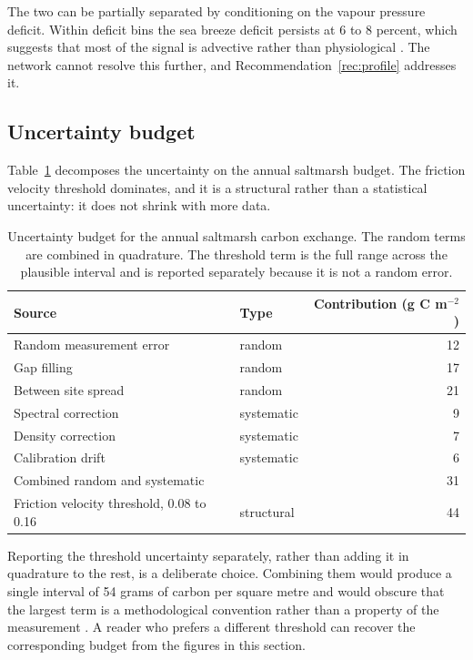 The two can be partially separated by conditioning on the vapour pressure
deficit. Within deficit bins the sea breeze deficit persists at 6 to 8 percent,
which suggests that most of the signal is advective rather than physiological
\citep{grothe2024seabreeze}.
The network cannot resolve this further, and Recommendation~\ref{rec:profile}
addresses it.

\subsection{Uncertainty budget}
\label{sec:results-uncertainty}

Table~\ref{tab:uncertainty} decomposes the uncertainty on the annual saltmarsh
budget. The friction velocity threshold dominates, and it is a structural rather
than a statistical uncertainty: it does not shrink with more data.

\begin{table}[t]
\centering
\small
\caption{Uncertainty budget for the annual saltmarsh carbon exchange. The random
terms are combined in quadrature. The threshold term is the full range across
the plausible interval and is reported separately because it is not a random
error.}
\label{tab:uncertainty}
\begin{tabular}{llr}
\toprule
Source & Type & Contribution (g C m$^{-2}$) \\
\midrule
Random measurement error   & random     & 12 \\
Gap filling                & random     & 17 \\
Between site spread        & random     & 21 \\
Spectral correction        & systematic & 9  \\
Density correction         & systematic & 7  \\
Calibration drift          & systematic & 6  \\
\midrule
Combined random and systematic & & 31 \\
\midrule
Friction velocity threshold, 0.08 to 0.16 & structural & 44 \\
\bottomrule
\end{tabular}
\end{table}

Reporting the threshold uncertainty separately, rather than adding it in
quadrature to the rest, is a deliberate choice. Combining them would produce a
single interval of 54 grams of carbon per square metre and would obscure that
the largest term is a methodological convention rather than a property of the
measurement \citep{almahdi2020ustar}. A reader who prefers a different threshold
can recover the corresponding budget from the figures in this section.
